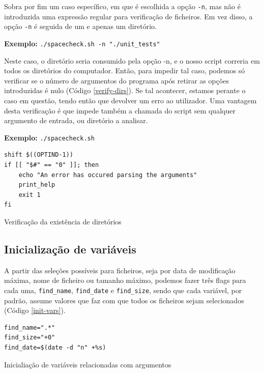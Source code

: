 Sobra por fim um caso específico, em que é escolhida a opção
\verb|-n|, mas não é introduzida uma expressão regular para
verificação de ficheiros. Em vez disso, a opção \verb|-n| é
seguida de um e apenas um diretório.
\begin{listing}[H]
    \centering
    \textbf{Exemplo:} \verb|./spacecheck.sh -n "./unit_tests"|
\end{listing}
Neste caso, o diretório seria consumido pela opção -n, e o
nosso script correria em todos os diretórios do computador. 
Então, para impedir tal caso, podemos só verificar se o número
de argumentos do programa após retirar as opções introduzidas é
nulo (Código \ref{verify-dirs}). Se tal acontecer, estamos perante o caso em questão,
tendo então que devolver um erro ao utilizador. 
Uma vantagem desta verificação é que impede também a chamada do
script sem qualquer argumento de entrada, ou diretório a analisar.
\begin{listing}[H]
    \centering
    \textbf{Exemplo:} \verb|./spacecheck.sh|
\end{listing}
\begin{listing}[H]
\begin{verbatim}
shift $((OPTIND-1))
if [[ "$#" == "0" ]]; then
    echo "An error has occured parsing the arguments"
    print_help
    exit 1
fi
\end{verbatim}
\caption{Verificação da existência de diretórios}
\label{verify-dirs}
\end{listing}

\subsection{Inicialização de variáveis}
A partir das seleções possíveis para ficheiros, seja por data
de modificação máxima, nome de ficheiro ou tamanho máximo,
podemos fazer três flags para cada uma, \verb|find_name|,
\verb|find_date| e \verb|find_size|, sendo que cada
variável, por padrão, assume valores que faz com que todos
os ficheiros sejam selecionados (Código \ref{init-vars}).

\begin{listing}[H]
\begin{verbatim}
find_name=".*"
find_size="+0"
find_date=$(date -d "n" +%s)
\end{verbatim}
\caption{Inicialiação de variáveis relacionadas com
argumentos}
\label{init-vars}
\end{listing}
